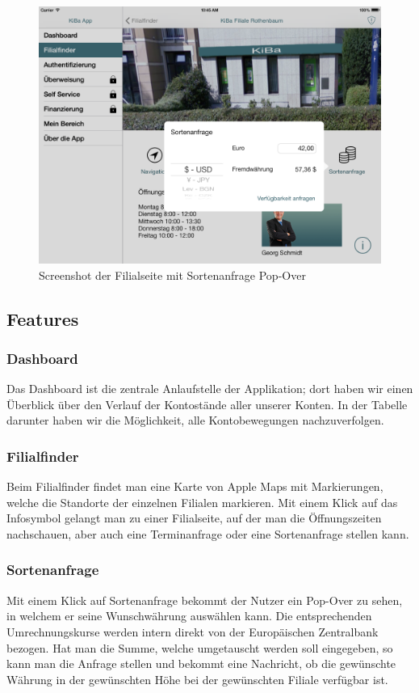\vspace{-12pt}
\begin{figure}[h!]
	\centering
	\includegraphics[height=0.25\textheight]{Pictures/Sortenanfrage}
	\vspace{-12pt}
	\caption{Screenshot der Filialseite mit Sortenanfrage Pop-Over}
	\label{fig3}
\end{figure}

\pagebreak
\subsection{Features}
\subsubsection{Dashboard}
Das Dashboard ist die zentrale Anlaufstelle der Applikation; dort haben wir einen Überblick über den Verlauf der Kontostände aller unserer Konten. In der Tabelle darunter haben wir die Möglichkeit, alle Kontobewegungen nachzuverfolgen.

\subsubsection{Filialfinder}
	Beim Filialfinder findet man eine Karte von Apple Maps mit Markierungen, welche die Standorte der einzelnen Filialen markieren. Mit einem Klick auf das Infosymbol gelangt man zu einer Filialseite, auf der man die Öffnungszeiten nachschauen, aber auch eine Terminanfrage oder eine Sortenanfrage stellen kann.

\subsubsection{Sortenanfrage}
	Mit einem Klick auf Sortenanfrage bekommt der Nutzer ein Pop-Over zu sehen, in welchem er seine Wunschwährung auswählen kann. Die entsprechenden Umrechnungskurse werden intern direkt von der Europäischen Zentralbank bezogen. Hat man die Summe, welche umgetauscht werden soll eingegeben, so kann man die Anfrage stellen und bekommt eine Nachricht, ob die gewünschte Währung in der gewünschten Höhe bei der gewünschten Filiale verfügbar ist.

